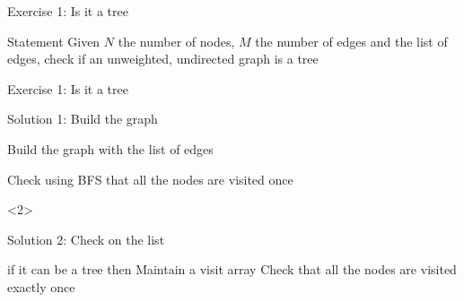 \documentclass[handout]{beamer}
\begin{document}
\begin{frame}{Exercise 1: Is it a tree}
  \begin{overlayarea}{\textwidth}{\textheight}
  \begin{block}{Statement}
    Given $N$ the number of nodes, $M$ the number of edges and the list of edges, check if an unweighted, undirected graph is a tree
  \end{block}
  
  
  
  \end{overlayarea}
\end{frame}

\begin{frame}[fragile]{Exercise 1: Is it a tree}

  \begin{code}{Solution 1: Build the graph}
    \begin{PseudoCode}
Build the graph with the list of edges

Check using BFS that all the nodes are visited once
    \end{PseudoCode}
  \end{code}
  
  \begin{uncoverenv}<2>  
  \begin{code}{Solution 2: Check on the list}
    \begin{PseudoCode}
if it can be a tree then
    Maintain a visit array
    Check that all the nodes are visited exactly once
    \end{PseudoCode}
  \end{code}
  \end{uncoverenv}
\end{frame}
\end{document}
